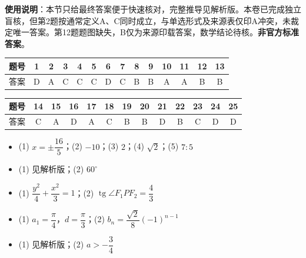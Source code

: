 
\begin{gknotice}
\textbf{使用说明}：本节只给最终答案便于快速核对，完整推导见解析版。本卷已完成独立盲核，但第2题按通常定义A、C同时成立，与单选形式及来源表仅印A冲突，未裁定唯一答案。第12题题图缺失，B仅为来源印载答案，数学结论待核。\textbf{非官方标准答案}。
\end{gknotice}

\begin{center}\begin{tabular}{cccccccccccccc}
\toprule
题号 & 1 & 2 & 3 & 4 & 5 & 6 & 7 & 8 & 9 & 10 & 11 & 12 & 13 \\
\midrule
答案 & D & A & C & C & C & D & C & B & B & A & A & B & B \\
\bottomrule
\end{tabular}\end{center}\medskip
\begin{center}\begin{tabular}{ccccccccccccc}
\toprule
题号 & 14 & 15 & 16 & 17 & 18 & 19 & 20 & 21 & 22 & 23 & 24 & 25 \\
\midrule
答案 & C & A & D & A & C & B & B & D & B & C & D & D \\
\bottomrule
\end{tabular}\end{center}

\begin{itemize}[leftmargin=2.6em]
  \item[\textbf{一.}] (1) $x=\pm\dfrac{16}{5}$；(2) $-10$；(3) $2$；(4) $\sqrt2$；(5) $7:5$
  \item[\textbf{二.}] (1) 见解析版；(2) $60^\circ$
  \item[\textbf{三.}] (1) $\dfrac{y^2}{4}+\dfrac{x^2}{3}=1$；(2) $\operatorname{tg}\angle F_1PF_2=\dfrac43$
  \item[\textbf{四.}] (1) $a_1=\dfrac\pi4$，$d=\dfrac\pi3$；(2) $b_n=\dfrac{\sqrt2}{8}(-1)^{n-1}$
  \item[\textbf{五.}] (1) 见解析版；(2) $a>-\dfrac34$
\end{itemize}
